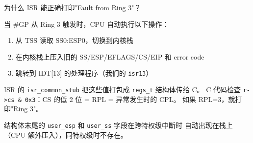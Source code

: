 \begin{whybox}
为什么 ISR 能正确打印"Fault from Ring 3"？

当 \#GP 从 Ring 3 触发时，CPU 自动执行以下操作：
\begin{enumerate}
  \item 从 TSS 读取 SS0:ESP0，切换到内核栈
  \item 在内核栈上压入旧的 SS/ESP/EFLAGS/CS/EIP 和 error code
  \item 跳转到 IDT[13] 的处理程序（我们的 \texttt{isr13}）
\end{enumerate}

ISR 的 \texttt{isr\_common\_stub} 把这些值打包成 \texttt{regs\_t} 结构体传给 C。
C 代码检查 \texttt{r->cs \& 0x3}：CS 的低 2 位 = RPL = 异常发生时的 CPL。
如果 RPL=3，就打印"Ring 3"。

结构体末尾的 \texttt{user\_esp} 和 \texttt{user\_ss} 字段在跨特权级中断时
自动出现在栈上（CPU 额外压入），同特权级时不存在。
\end{whybox}
